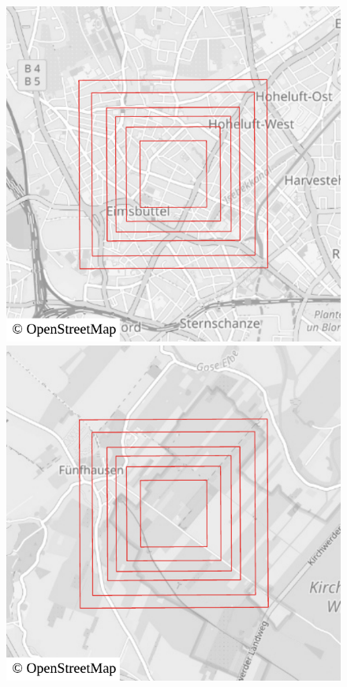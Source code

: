 		\begin{figure}[h!]
			\centering
			\begin{minipage}[t]{.38\textwidth}
				\begin{figcenter}
					\includegraphics[width=\textwidth]{images/qgis-overview-city-rural_city}
				\end{figcenter}
			\end{minipage}
			\hspace{0.04\textwidth}
			\begin{minipage}[t]{.38\textwidth}
				\begin{figcenter}
					\includegraphics[width=\textwidth]{images/qgis-overview-city-rural_rural}

\end{figcenter}
\end{minipage}
\end{figure}
